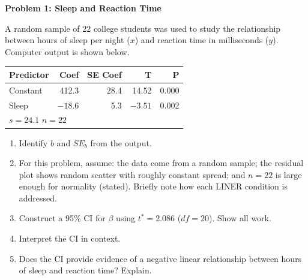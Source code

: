 \documentclass[10pt]{article}
\begin{document}
\namedateperiod

\vspace{0.1in}

\textbf{Problem 1: Sleep and Reaction Time}

\vspace{0.05in}
A random sample of 22 college students was used to study the relationship between hours
of sleep per night ($x$) and reaction time in milliseconds ($y$). Computer output is
shown below.

\vspace{0.1in}
\begin{center}
\renewcommand{\arraystretch}{1.3}
\begin{tabular}{lrrrr}
    \textbf{Predictor} & \textbf{Coef} & \textbf{SE Coef} & \textbf{T} & \textbf{P} \\
    \hline
    Constant & 412.3 & 28.4 & 14.52 & 0.000 \\
    Sleep    & $-18.6$ & 5.3 & $-3.51$ & 0.002 \\
    \hline
    \multicolumn{5}{l}{$s = 24.1$ \quad $n = 22$}
\end{tabular}
\end{center}

\vspace{0.1in}
\begin{enumerate}[label=\alph*.]

    \item Identify $b$ and $SE_b$ from the output.

    \item For this problem, assume: the data come from a random sample; the residual plot
          shows random scatter with roughly constant spread; and $n = 22$ is large enough
          for normality (stated). Briefly note how each LINER condition is addressed.

    \item Construct a 95\% CI for $\beta$ using $t^* = 2.086$ ($df = 20$). Show all work.

    \item Interpret the CI in context.

    \item Does the CI provide evidence of a negative linear relationship between hours of
          sleep and reaction time? Explain.

\end{enumerate}
\end{document}
